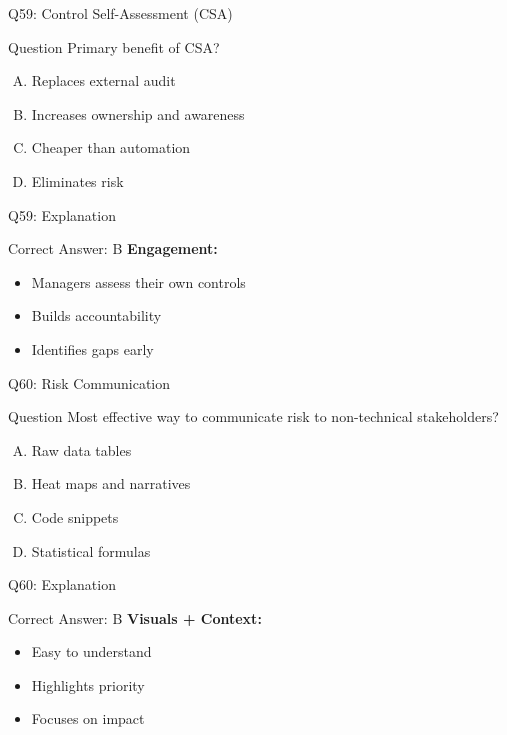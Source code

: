 \documentclass{beamer}
\begin{document}
			\begin{frame}{Q59: Control Self-Assessment (CSA)}
				\begin{block}{Question}
					Primary benefit of CSA?
				\end{block}
				\begin{enumerate}[(A)]
					\item Replaces external audit
					\item Increases ownership and awareness
					\item Cheaper than automation
					\item Eliminates risk
				\end{enumerate}
			\end{frame}
			\begin{frame}{Q59: Explanation}
				\begin{block}{Correct Answer: B}
					\textbf{Engagement:}
					\begin{itemize}
						\item Managers assess their own controls
						\item Builds accountability
						\item Identifies gaps early
					\end{itemize}
				\end{block}
			\end{frame}
			
			\begin{frame}{Q60: Risk Communication}
				\begin{block}{Question}
					Most effective way to communicate risk to non-technical stakeholders?
				\end{block}
				\begin{enumerate}[(A)]
					\item Raw data tables
					\item Heat maps and narratives
					\item Code snippets
					\item Statistical formulas
				\end{enumerate}
			\end{frame}
			\begin{frame}{Q60: Explanation}
				\begin{block}{Correct Answer: B}
					\textbf{Visuals + Context:}
					\begin{itemize}
						\item Easy to understand
						\item Highlights priority
						\item Focuses on impact
					\end{itemize}
				\end{block}
			\end{frame}
			
\end{document}
